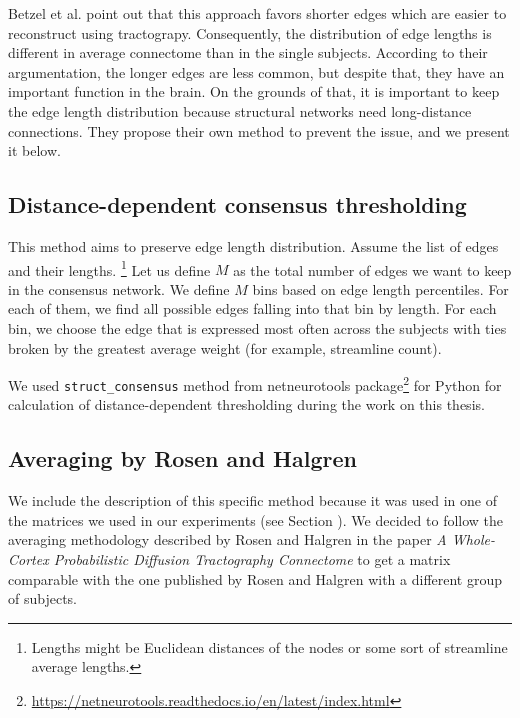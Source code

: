 Betzel et al. point out that this approach favors shorter edges which are easier to reconstruct using tractograpy. Consequently, the distribution of edge lengths is different in average connectome than in the single subjects. According to their argumentation, the longer edges are less common, but despite that, they have an important function in the brain. On the grounds of that, it is important to keep the edge length distribution because structural networks need long-distance connections. They propose their own method to prevent the issue, and we present it below. \cite{betzel_distance-dependent_2019} 

\subsection{Distance-dependent consensus thresholding}\label{sec:dist-dep}

This method aims to preserve edge length distribution. Assume the list of edges and their lengths. \footnote{Lengths might be Euclidean distances of the nodes or some sort of streamline average lengths.} Let us define $M$ as the total number of edges we want to keep in the consensus network. We define $M$ bins based on edge length percentiles. For each of them, we find all possible edges falling into that bin by length. For each bin, we choose the edge that is expressed most often across the subjects with ties broken by the greatest average weight (for example, streamline count). \cite{betzel_distance-dependent_2019} 

We used \texttt{struct\_consensus} method from netneurotools package\footnote{\url{https://netneurotools.readthedocs.io/en/latest/index.html}} for Python for calculation of distance-dependent thresholding during the work on this thesis.

\subsection{Averaging by Rosen and Halgren}\label{sec:rh}

We include the description of this specific method because it was used in one of the matrices we used in our experiments (see Section \TODO). We decided to follow the averaging methodology described by Rosen and Halgren in the paper \textit{A Whole-Cortex Probabilistic Diffusion Tractography Connectome} \cite{rosen_whole-cortex_2021} to get a matrix comparable with the one published by Rosen and Halgren with a different group of subjects.

